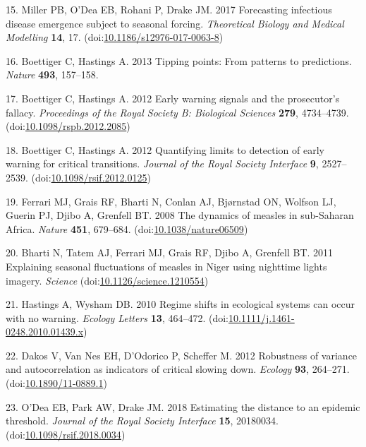 \documentclass[3p]{elsarticle} %
\begin{document}
\leavevmode\hypertarget{ref-Miller2017}{}%
15. Miller PB, O'Dea EB, Rohani P, Drake JM. 2017 Forecasting infectious
disease emergence subject to seasonal forcing. \emph{Theoretical Biology
and Medical Modelling} \textbf{14}, 17.
(doi:\href{https://doi.org/10.1186/s12976-017-0063-8}{10.1186/s12976-017-0063-8})

\leavevmode\hypertarget{ref-Boettiger2013}{}%
16. Boettiger C, Hastings A. 2013 Tipping points: From patterns to
predictions. \emph{Nature} \textbf{493}, 157--158.

\leavevmode\hypertarget{ref-Boettiger2012a}{}%
17. Boettiger C, Hastings A. 2012 Early warning signals and the
prosecutor's fallacy. \emph{Proceedings of the Royal Society B:
Biological Sciences} \textbf{279}, 4734--4739.
(doi:\href{https://doi.org/10.1098/rspb.2012.2085}{10.1098/rspb.2012.2085})

\leavevmode\hypertarget{ref-Boettiger2012}{}%
18. Boettiger C, Hastings A. 2012 Quantifying limits to detection of
early warning for critical transitions. \emph{Journal of the Royal
Society Interface} \textbf{9}, 2527--2539.
(doi:\href{https://doi.org/10.1098/rsif.2012.0125}{10.1098/rsif.2012.0125})

\leavevmode\hypertarget{ref-Ferrari2008}{}%
19. Ferrari MJ, Grais RF, Bharti N, Conlan AJ, Bjørnstad ON, Wolfson LJ,
Guerin PJ, Djibo A, Grenfell BT. 2008 The dynamics of measles in
sub-Saharan Africa. \emph{Nature} \textbf{451}, 679--684.
(doi:\href{https://doi.org/10.1038/nature06509}{10.1038/nature06509})

\leavevmode\hypertarget{ref-Bharti2011}{}%
20. Bharti N, Tatem AJ, Ferrari MJ, Grais RF, Djibo A, Grenfell BT. 2011
Explaining seasonal fluctuations of measles in Niger using nighttime
lights imagery. \emph{Science}
(doi:\href{https://doi.org/10.1126/science.1210554}{10.1126/science.1210554})

\leavevmode\hypertarget{ref-Hastings2010}{}%
21. Hastings A, Wysham DB. 2010 Regime shifts in ecological systems can
occur with no warning. \emph{Ecology Letters} \textbf{13}, 464--472.
(doi:\href{https://doi.org/10.1111/j.1461-0248.2010.01439.x}{10.1111/j.1461-0248.2010.01439.x})

\leavevmode\hypertarget{ref-Dakos2012a}{}%
22. Dakos V, Van Nes EH, D'Odorico P, Scheffer M. 2012 Robustness of
variance and autocorrelation as indicators of critical slowing down.
\emph{Ecology} \textbf{93}, 264--271.
(doi:\href{https://doi.org/10.1890/11-0889.1}{10.1890/11-0889.1})

\leavevmode\hypertarget{ref-ODea2018a}{}%
23. O'Dea EB, Park AW, Drake JM. 2018 Estimating the distance to an
epidemic threshold. \emph{Journal of the Royal Society Interface}
\textbf{15}, 20180034.
(doi:\href{https://doi.org/10.1098/rsif.2018.0034}{10.1098/rsif.2018.0034})
\end{document}
